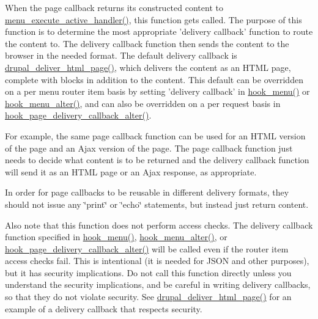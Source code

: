 When the page callback returns its constructed content to \hyperlink{group__menu_gae33bae24fcac6126aa272d1c437f947c}{menu\_\-execute\_\-active\_\-handler()}, this function gets called. The purpose of this function is to determine the most appropriate 'delivery callback' function to route the content to. The delivery callback function then sends the content to the browser in the needed format. The default delivery callback is \hyperlink{common_8inc_a05ab0d6e81d6cbe2a6b9f645b9e710ec}{drupal\_\-deliver\_\-html\_\-page()}, which delivers the content as an HTML page, complete with blocks in addition to the content. This default can be overridden on a per menu router item basis by setting 'delivery callback' in \hyperlink{group__hooks_ga5c95244fea59b25666e409759e133ded}{hook\_\-menu()} or \hyperlink{group__hooks_ga4c37deddcf48dbfe6f3081df1652f6fa}{hook\_\-menu\_\-alter()}, and can also be overridden on a per request basis in \hyperlink{group__hooks_gaee6a1d02d5046d47069a8e385385ef15}{hook\_\-page\_\-delivery\_\-callback\_\-alter()}.

For example, the same page callback function can be used for an HTML version of the page and an Ajax version of the page. The page callback function just needs to decide what content is to be returned and the delivery callback function will send it as an HTML page or an Ajax response, as appropriate.

In order for page callbacks to be reusable in different delivery formats, they should not issue any \char`\"{}print\char`\"{} or \char`\"{}echo\char`\"{} statements, but instead just return content.

Also note that this function does not perform access checks. The delivery callback function specified in \hyperlink{group__hooks_ga5c95244fea59b25666e409759e133ded}{hook\_\-menu()}, \hyperlink{group__hooks_ga4c37deddcf48dbfe6f3081df1652f6fa}{hook\_\-menu\_\-alter()}, or \hyperlink{group__hooks_gaee6a1d02d5046d47069a8e385385ef15}{hook\_\-page\_\-delivery\_\-callback\_\-alter()} will be called even if the router item access checks fail. This is intentional (it is needed for JSON and other purposes), but it has security implications. Do not call this function directly unless you understand the security implications, and be careful in writing delivery callbacks, so that they do not violate security. See \hyperlink{common_8inc_a05ab0d6e81d6cbe2a6b9f645b9e710ec}{drupal\_\-deliver\_\-html\_\-page()} for an example of a delivery callback that respects security.


